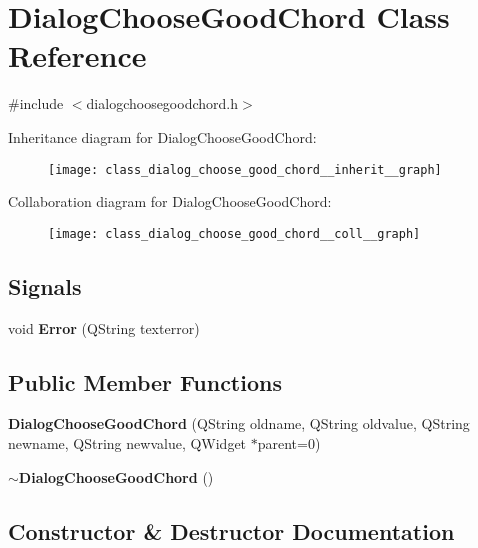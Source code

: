 \section{Dialog\+Choose\+Good\+Chord Class Reference}
\label{class_dialog_choose_good_chord}


{\ttfamily \#include $<$dialogchoosegoodchord.\+h$>$}



Inheritance diagram for Dialog\+Choose\+Good\+Chord\+:\nopagebreak
\begin{figure}[H]
\begin{center}
\leavevmode
\texttt{[image: class\_dialog\_choose\_good\_chord\_\_inherit\_\_graph]}
\end{center}
\end{figure}


Collaboration diagram for Dialog\+Choose\+Good\+Chord\+:\nopagebreak
\begin{figure}[H]
\begin{center}
\leavevmode
\texttt{[image: class\_dialog\_choose\_good\_chord\_\_coll\_\_graph]}
\end{center}
\end{figure}
\subsection*{Signals}
\begin{DoxyCompactItemize}
\item 
void \textbf{ Error} (Q\+String texterror)
\end{DoxyCompactItemize}
\subsection*{Public Member Functions}
\begin{DoxyCompactItemize}
\item 
\textbf{ Dialog\+Choose\+Good\+Chord} (Q\+String oldname, Q\+String oldvalue, Q\+String newname, Q\+String newvalue, Q\+Widget $\ast$parent=0)
\item 
\textbf{ $\sim$\+Dialog\+Choose\+Good\+Chord} ()
\end{DoxyCompactItemize}


\subsection{Constructor \& Destructor Documentation}
\mbox{\label{class_dialog_choose_good_chord_a42f1b2a7699d81ecacca7e60c9de8632}} 
